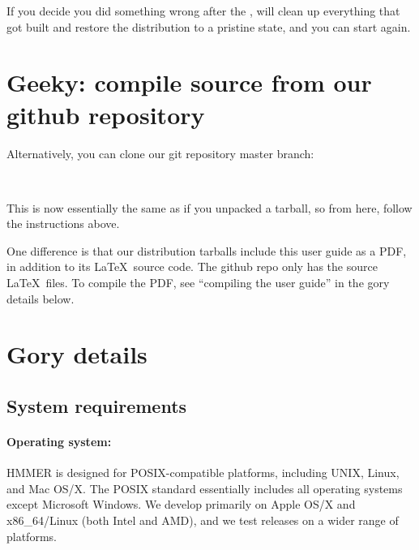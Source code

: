 If you decide you did something wrong after the ,
 will clean up everything that got built and
restore the distribution to a pristine state, and you can start again.


\section{Geeky: compile source from our github repository}

Alternatively, you can clone our git repository master
branch:
  
  \vspace{1ex}
   \\
  \vspace{1ex}

This is now essentially the same as if you unpacked a tarball, so from
here, follow the  instructions above.

One difference is that our distribution tarballs include this user
guide as a PDF, in addition to its \LaTeX\ source code. The github
repo only has the source \LaTeX\ files. To compile the PDF, see
``compiling the user guide'' in the gory details below.


\section{Gory details}

\subsection{System requirements}

\paragraph{Operating system:} HMMER is designed for
POSIX-compatible platforms, including UNIX, Linux, and Mac OS/X. The
POSIX standard essentially includes all operating systems except
Microsoft Windows.  We develop primarily on Apple OS/X and
x86\_64/Linux (both Intel and AMD), and we test releases on a wider
range of platforms.
  

